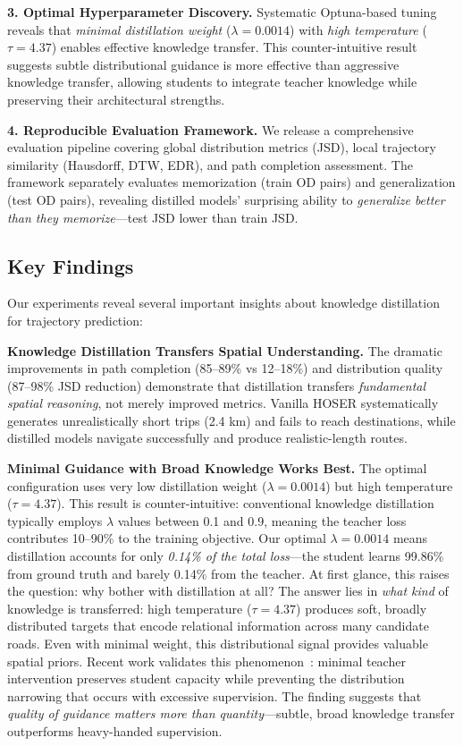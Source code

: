 \textbf{3. Optimal Hyperparameter Discovery.} Systematic Optuna-based tuning reveals that \emph{minimal distillation weight} ($\lambda = 0.0014$) with \emph{high temperature} ($\tau = 4.37$) enables effective knowledge transfer. This counter-intuitive result suggests subtle distributional guidance is more effective than aggressive knowledge transfer, allowing students to integrate teacher knowledge while preserving their architectural strengths.

\textbf{4. Reproducible Evaluation Framework.} We release a comprehensive evaluation pipeline covering global distribution metrics (JSD), local trajectory similarity (Hausdorff, DTW, EDR), and path completion assessment. The framework separately evaluates memorization (train OD pairs) and generalization (test OD pairs), revealing distilled models' surprising ability to \emph{generalize better than they memorize}—test JSD lower than train JSD.

\subsection{Key Findings}
\label{sec:conclusion-findings}

Our experiments reveal several important insights about knowledge distillation for trajectory prediction:

\textbf{Knowledge Distillation Transfers Spatial Understanding.} The dramatic improvements in path completion (85--89\% vs 12--18\%) and distribution quality (87--98\% JSD reduction) demonstrate that distillation transfers \emph{fundamental spatial reasoning}, not merely improved metrics. Vanilla HOSER systematically generates unrealistically short trips (2.4 km) and fails to reach destinations, while distilled models navigate successfully and produce realistic-length routes.

\textbf{Minimal Guidance with Broad Knowledge Works Best.} The optimal configuration uses very low distillation weight ($\lambda = 0.0014$) but high temperature ($\tau = 4.37$). This result is counter-intuitive: conventional knowledge distillation typically employs $\lambda$ values between 0.1 and 0.9, meaning the teacher loss contributes 10--90\% to the training objective. Our optimal $\lambda = 0.0014$ means distillation accounts for only \emph{0.14\% of the total loss}—the student learns 99.86\% from ground truth and barely 0.14\% from the teacher. At first glance, this raises the question: why bother with distillation at all? The answer lies in \emph{what kind} of knowledge is transferred: high temperature ($\tau = 4.37$) produces soft, broadly distributed targets that encode relational information across many candidate roads. Even with minimal weight, this distributional signal provides valuable spatial priors. Recent work validates this phenomenon~\cite{pengAdaSwitchAdaptiveSwitching2025,singhORPODistillMixedPolicyPreference2025}: minimal teacher intervention preserves student capacity while preventing the distribution narrowing that occurs with excessive supervision. The finding suggests that \emph{quality of guidance matters more than quantity}—subtle, broad knowledge transfer outperforms heavy-handed supervision.

